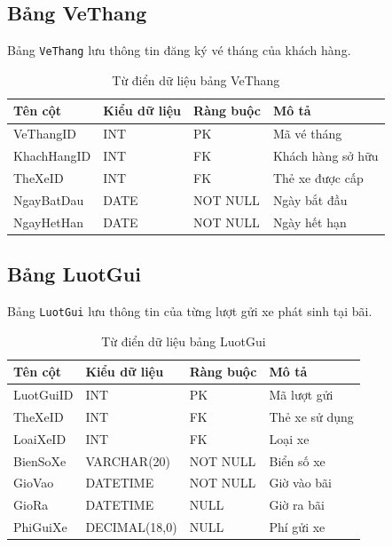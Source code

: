 \subsection{Bảng VeThang}

Bảng \texttt{VeThang} lưu thông tin đăng ký vé tháng của khách hàng.

\begin{table}[htbp]
    \centering
    \begin{tabular}{llll}
        \toprule
        \textbf{Tên cột} & \textbf{Kiểu dữ liệu} & \textbf{Ràng buộc} & \textbf{Mô tả} \\
        \midrule
        VeThangID   & INT  & PK & Mã vé tháng \\
        KhachHangID & INT  & FK & Khách hàng sở hữu \\
        TheXeID     & INT  & FK & Thẻ xe được cấp \\
        NgayBatDau  & DATE & NOT NULL & Ngày bắt đầu \\
        NgayHetHan  & DATE & NOT NULL & Ngày hết hạn \\
        \bottomrule
    \end{tabular}
    \caption{Từ điển dữ liệu bảng VeThang}
    \label{tab:vethang}
\end{table}

\subsection{Bảng LuotGui}

Bảng \texttt{LuotGui} lưu thông tin của từng lượt gửi xe phát sinh tại bãi.

\begin{table}[htbp]
    \centering
    \begin{tabular}{llll}
        \toprule
        \textbf{Tên cột} & \textbf{Kiểu dữ liệu} & \textbf{Ràng buộc} & \textbf{Mô tả} \\
        \midrule
        LuotGuiID & INT           & PK       & Mã lượt gửi \\
        TheXeID   & INT           & FK       & Thẻ xe sử dụng \\
        LoaiXeID  & INT           & FK       & Loại xe \\
        BienSoXe  & VARCHAR(20)   & NOT NULL & Biển số xe \\
        GioVao    & DATETIME      & NOT NULL & Giờ vào bãi \\
        GioRa     & DATETIME      & NULL     & Giờ ra bãi \\
        PhiGuiXe  & DECIMAL(18,0) & NULL     & Phí gửi xe \\
        \bottomrule
    \end{tabular}
    \caption{Từ điển dữ liệu bảng LuotGui}
    \label{tab:luotgui}
\end{table}

